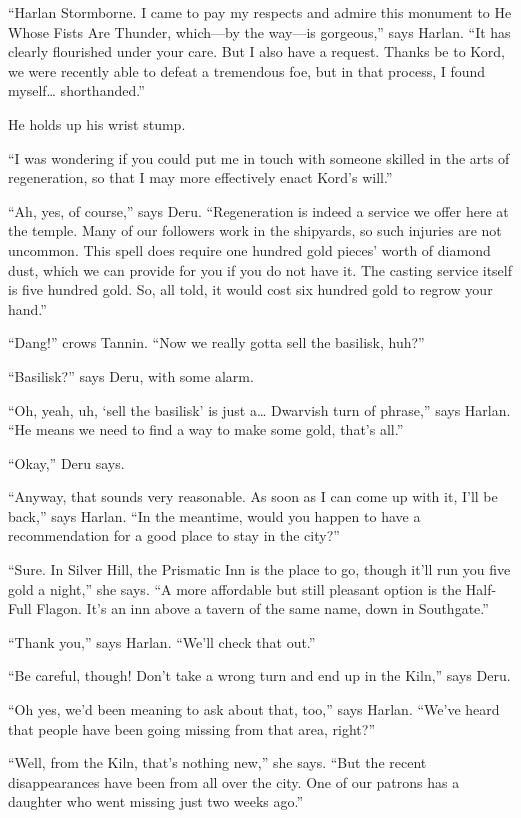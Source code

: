 \documentclass[smalldemyvopaper,11pt,twoside,onecolumn,openright,extrafontsizes]{memoir}
\begin{document}
``Harlan Stormborne. I came to pay my respects and admire this monument
to He Whose Fists Are Thunder, which---by the way---is gorgeous,'' says
Harlan. ``It has clearly flourished under your care. But I also have a
request. Thanks be to Kord, we were recently able to defeat a tremendous
foe, but in that process, I found myself\ldots{} shorthanded.''

He holds up his wrist stump.

``I was wondering if you could put me in touch with someone skilled in
the arts of regeneration, so that I may more effectively enact Kord's
will.''

``Ah, yes, of course,'' says Deru. ``Regeneration is indeed a service we
offer here at the temple. Many of our followers work in the shipyards,
so such injuries are not uncommon. This spell does require one hundred
gold pieces' worth of diamond dust, which we can provide for you if you
do not have it. The casting service itself is five hundred gold. So, all
told, it would cost six hundred gold to regrow your hand.''

``Dang!'' crows Tannin. ``Now we really gotta sell the basilisk, huh?''

``Basilisk?'' says Deru, with some alarm.

``Oh, yeah, uh, `sell the basilisk' is just a\ldots{} Dwarvish turn of
phrase,'' says Harlan. ``He means we need to find a way to make some
gold, that's all.''

``Okay,'' Deru says.

``Anyway, that sounds very reasonable. As soon as I can come up with it,
I'll be back,'' says Harlan. ``In the meantime, would you happen to have
a recommendation for a good place to stay in the city?''

``Sure. In Silver Hill, the Prismatic Inn is the place to go, though
it'll run you five gold a night,'' she says. ``A more affordable but
still pleasant option is the Half-Full Flagon. It's an inn above a
tavern of the same name, down in Southgate.''

``Thank you,'' says Harlan. ``We'll check that out.''

``Be careful, though! Don't take a wrong turn and end up in the Kiln,''
says Deru.

``Oh yes, we'd been meaning to ask about that, too,'' says Harlan.
``We've heard that people have been going missing from that area,
right?''

``Well, from the Kiln, that's nothing new,'' she says. ``But the recent
disappearances have been from all over the city. One of our patrons has
a daughter who went missing just two weeks ago.''
\end{document}
